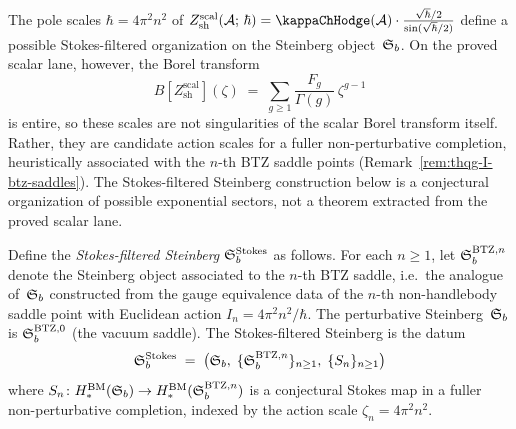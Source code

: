 The pole scales $\hbar = 4\pi^2 n^2$ of
$Z_{\mathrm{sh}}^{\mathrm{scal}}(\cA;\,\hbar)
= \kappaChHodge(\cA)\cdot
\frac{\sqrt{\hbar}/2}{\sin(\sqrt{\hbar}/2)}$
define a possible Stokes-filtered organization on the
Steinberg object~$\mathfrak{S}_b$. On the proved scalar lane, however,
the Borel transform
\[
B[Z_{\mathrm{sh}}^{\mathrm{scal}}](\zeta) \;=\; \sum_{g \geq 1} \frac{F_g}{\Gamma(g)}\,\zeta^{g-1}
\]
is entire, so these scales are not singularities of the scalar Borel
transform itself. Rather, they are candidate action scales for a
fuller non-perturbative completion, heuristically associated with the
$n$-th BTZ saddle points (Remark~\ref{rem:thqg-I-btz-saddles}).
The Stokes-filtered Steinberg construction below is a conjectural
organization of possible exponential sectors,
not a theorem extracted from the proved scalar lane.

\begin{construction}
Define the \emph{Stokes-filtered Steinberg} $\mathfrak{S}_b^{\mathrm{Stokes}}$ as follows. For each $n \geq 1$, let $\mathfrak{S}_b^{\mathrm{BTZ},n}$ denote the Steinberg object associated to the $n$-th BTZ saddle, i.e.\ the analogue of~$\mathfrak{S}_b$ constructed from the gauge equivalence data of the $n$-th non-handlebody saddle point with Euclidean action $I_n = 4\pi^2 n^2 / \hbar$. The perturbative Steinberg~$\mathfrak{S}_b$ is $\mathfrak{S}_b^{\mathrm{BTZ},0}$ (the vacuum saddle). The Stokes-filtered Steinberg is the datum
\[
\mathfrak{S}_b^{\mathrm{Stokes}} \;=\; \bigl(\mathfrak{S}_b,\;\{\mathfrak{S}_b^{\mathrm{BTZ},n}\}_{n \geq 1},\;\{S_n\}_{n \geq 1}\bigr)
\]
where $S_n \colon H_*^{\mathrm{BM}}(\mathfrak{S}_b) \to H_*^{\mathrm{BM}}(\mathfrak{S}_b^{\mathrm{BTZ},n})$ is a conjectural Stokes map in a fuller non-perturbative completion, indexed by the action scale $\zeta_n = 4\pi^2 n^2$.
\end{construction}


